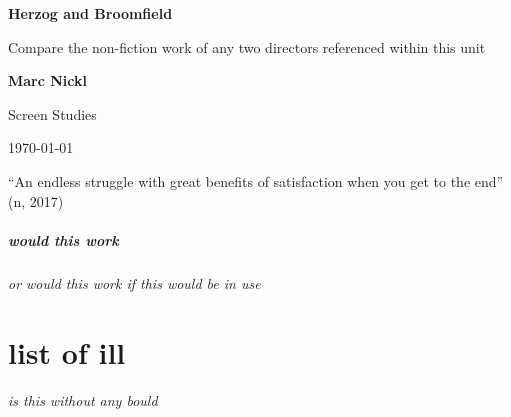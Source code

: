 \documentclass[
  12pt,
]{book}
\author{}
\date{}
\begin{document}
\frontmatter

\mainmatter
{}

\begin{titlepage}
    \begin{center}
        \vspace*{4cm}
            
  \LARGE
        \textbf{Herzog and Broomfield}
            
 \vspace{0.5cm}
        \Large
        Compare the non-fiction work of any two directors referenced within this unit
            
   \vspace{10cm}
            
\textbf{Marc Nickl}
            
\vfill
            
            
 \vspace{0.8cm}
                        
   \large
        Screen Studies 
        
\today
            
 \end{center}
\end{titlepage}

\setcounter{tocdepth}{3}
\tableofcontents
\pagebreak

\vspace{20pt}

\begin{center}
“An endless struggle with great benefits of satisfaction when you get to the end” (n, 2017)

\end{center}


\subsubsection{would this work}

\paragraph*{or would this work if this would be in use
}
\part{list of ill}


\paragraph{is this without any bould}
\end{document}
